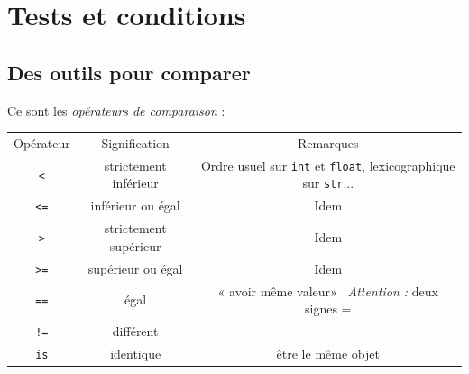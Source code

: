 \chapter{Tests et conditions}
\section{Des outils pour comparer}

Ce sont les \textit{opérateurs de comparaison} :\\

{\small
\tabstyle[UGLiBlue]
\begin{tabular}{C|C|C}
	\ccell Opérateur            & \ccell Signification  & \ccell Remarques                                                                                                        \\
	
	\texttt{<}      & strictement inférieur & Ordre usuel sur \texttt{int} et \texttt{float}, lexicographique sur \texttt{str}... \\
	
	\texttt{<=}     & inférieur ou égal     & Idem                                                                                                                    \\
	
	\texttt{>}      & strictement supérieur & Idem                                                                                                                    \\
	
	\texttt{>=}     & supérieur ou égal     & Idem                                                                                                                    \\
	
	\texttt{==}     & égal                  & « avoir même valeur» \  \textit{Attention :} deux signes =                                                              \\
	
	\texttt{!=}     & différent             &                                                                                                                         \\
	
	\texttt{is}     & identique             & être le même objet                                                                                                      \\
	

\end{tabular}}
